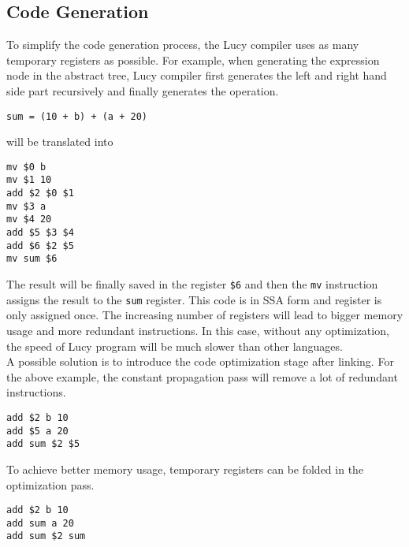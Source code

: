 \subsection{Code Generation}
To simplify the code generation process, the Lucy compiler uses as many temporary registers as possible. For example, when generating the expression node in the abstract tree, Lucy compiler first generates the left and right hand side part recursively and finally generates the operation.
\begin{lstlisting}
sum = (10 + b) + (a + 20)
\end{lstlisting}
will be translated into
\begin{lstlisting}[language=LucyX]
mv $0 b
mv $1 10
add $2 $0 $1
mv $3 a
mv $4 20
add $5 $3 $4
add $6 $2 $5
mv sum $6
\end{lstlisting}
The result will be finally saved in the register \texttt{\$6} and then the \texttt{mv} instruction assigns the result to the \texttt{sum} register. This code is in SSA form and register is only assigned once. The increasing number of registers will lead to bigger memory usage and more redundant instructions. In this case, without any optimization, the speed of Lucy program will be much slower than other languages. \\
A possible solution is to introduce the code optimization stage after linking. For the above example, the constant propagation pass will remove a lot of redundant instructions.
\begin{lstlisting}[language=LucyX]
add $2 b 10
add $5 a 20
add sum $2 $5
\end{lstlisting}
To achieve better memory usage, temporary registers can be folded in the optimization pass.
\begin{lstlisting}[language=LucyX]
add $2 b 10
add sum a 20
add sum $2 sum
\end{lstlisting}

